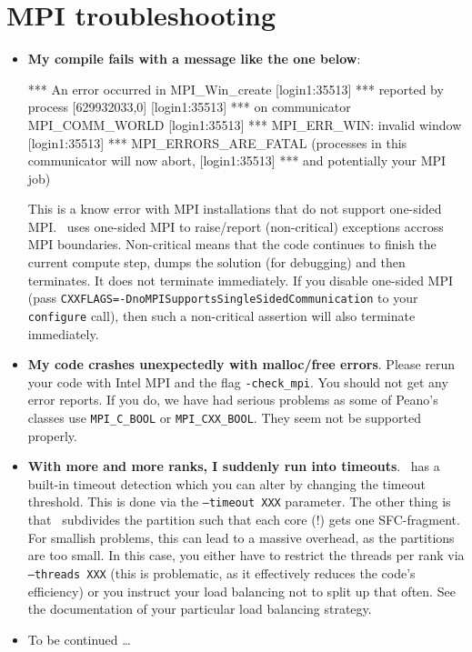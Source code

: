 \section{MPI troubleshooting}
\begin{itemize}
  \item \textbf{My compile fails with a message like the one below}:
  \begin{terminalOutput}
[login1:35513] *** An error occurred in MPI_Win_create
[login1:35513] *** reported by process [629932033,0]
[login1:35513] *** on communicator MPI_COMM_WORLD
[login1:35513] *** MPI_ERR_WIN: invalid window
[login1:35513] *** MPI_ERRORS_ARE_FATAL (processes in this communicator will now abort,
[login1:35513] ***    and potentially your MPI job)  
  \end{terminalOutput}
  This is a know error with MPI installations that do not support one-sided MPI. 
  \Peano\ uses one-sided MPI to raise/report (non-critical) exceptions accross MPI boundaries.
  Non-critical means that the code continues to finish the current compute step,
  dumps the solution (for debugging) and then terminates. It does not terminate
		immediately. If you disable one-sided MPI (pass \linebreak \texttt{CXXFLAGS=-DnoMPISupportsSingleSidedCommunication} to your \texttt{configure} call), then such a non-critical assertion
  will also terminate immediately.
  \item \textbf{My code crashes unexpectedly with malloc/free errors}. Please
  rerun your code with Intel MPI and the flag \texttt{-check\_mpi}. You should
  not get any error reports. If you do, we have had serious problems as some of
  Peano's classes use \texttt{MPI\_C\_BOOL} or \texttt{MPI\_CXX\_BOOL}. They
  seem not be supported properly.
  \item \textbf{With more and more ranks, I suddenly run into timeouts}. \Peano\
  has a built-in timeout detection which you can alter by changing the timeout
  threshold. This is done via the \texttt{--timeout XXX} parameter. The other
  thing is that \Peano\ subdivides the partition such that each core (!) gets
  one SFC-fragment. For smallish problems, this can lead to a massive overhead, as
  the partitions are too small. In this case, you either have to restrict the
  threads per rank via \texttt{--threads XXX} (this is problematic, as it
  effectively reduces the code's efficiency) or you instruct your load balancing
  not to split up that often. See the documentation of your particular load
  balancing strategy.
  \item To be continued \dots
\end{itemize}





